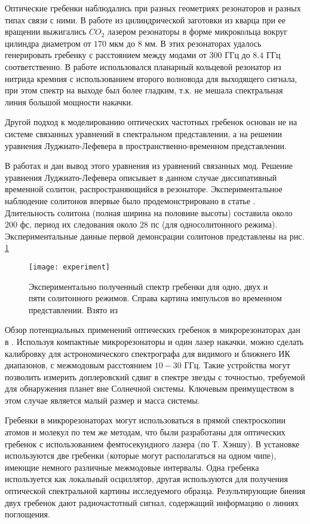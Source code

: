 Оптические гребенки наблюдались при разных геометриях резонаторов и разных типах связи с ними. В работе \cite{DelHaye2013} из цилиндрической заготовки из кварца при ее вращении выжигались $CO_2$ лазером резонаторы в форме микрокольца вокруг цилиндра диаметром от $170$ мкм до $8$ мм. В этих резонаторах удалось генерировать гребенку с расстоянием между модами от $300$ ГГц до $8.4$ ГГц соответственно. В работе \cite{Wang2013oe} использовался планарный кольцевой резонатор из нитрида кремния с использованием второго волновода для выходящего сигнала, при этом спектр на выходе был более гладким, т.к. не мешала спектральная линия большой мощности накачки.

Другой подход к моделированию оптических частотных гребенок основан не на системе связанных уравнений в спектральном представлении, а на решении уравнения Луджиато-Лефевера в пространственно-временном представлении.

В работах \cite{Matsko2011} и \cite{Chembo2013} дан вывод этого уравнения из уравнений связанных мод. Решение уравнения Луджиато-Лефевера описывает в данном случае диссипативный временной солитон, распространяющийся в резонаторе. Экспериментальное наблюдение солитонов впервые было продемонстрировано в статье \cite{Herr2014}. Длительность солитона (полная ширина на половине высоты) составила около $200$ фс, период их следования около $28$ пс (для односолитонного режима). Экспериментальные данные первой демонсрации солитонов представлены на рис. \ref{experiment}

\begin{figure}
  \texttt{[image: experiment]}
  \caption{Экспериментально полученный спектр гребенки для одно, двух и пяти солитонного режимов. Справа картина импульсов во временном представлении. Взято из \cite{Herr2014}} \label{experiment}
\end{figure}

Обзор потенциальных применений оптических гребенок в микрорезонаторах дан в \cite{Kippenberg2011}. Используя компактные микрорезонаторы и один лазер накачки, можно сделать калибровку для астрономического спектрографа для видимого и ближнего ИК диапазонов, с межмодовым расстоянием $10-30$ ГГц. Такие устройства могут позволить измерить доплеровский сдвиг в спектре звезды с точностью, требуемой для обнаружения планет вне Солнечной системы. Ключевым преимуществом в этом случае является малый размер и масса системы.

Гребенки в микрорезонаторах могут использоваться в прямой спектроскопии атомов и молекул по тем же методам, что были разработаны для оптических гребенок с использованием фемтосекундного лазера (по Т. Хэншу). В установке используются две гребенки (которые могут располагаться на одном чипе), имеющие немного различные межмодовые интервалы. Одна гребенка используется как локальный осциллятор, другая используются для получения оптической спектральной картины исследуемого образца. Результирующие биения двух гребенок дают радиочастотный сигнал, содержащий информацию о линиях поглощения.

